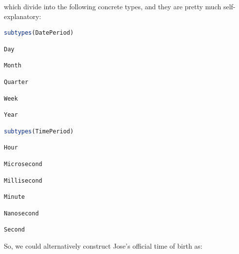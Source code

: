 \documentclass[
  notoc %
]{tufte-book}
\begin{document}
which divide into the following concrete types, and they are pretty much
self-explanatory:

\begin{lstlisting}[language=Julia]
subtypes(DatePeriod)
\end{lstlisting}

\begin{lstlisting}[language=Output]
Day
\end{lstlisting}

\begin{lstlisting}[language=Output]
Month
\end{lstlisting}

\begin{lstlisting}[language=Output]
Quarter
\end{lstlisting}

\begin{lstlisting}[language=Output]
Week
\end{lstlisting}

\begin{lstlisting}[language=Output]
Year
\end{lstlisting}

\begin{lstlisting}[language=Julia]
subtypes(TimePeriod)
\end{lstlisting}

\begin{lstlisting}[language=Output]
Hour
\end{lstlisting}

\begin{lstlisting}[language=Output]
Microsecond
\end{lstlisting}

\begin{lstlisting}[language=Output]
Millisecond
\end{lstlisting}

\begin{lstlisting}[language=Output]
Minute
\end{lstlisting}

\begin{lstlisting}[language=Output]
Nanosecond
\end{lstlisting}

\begin{lstlisting}[language=Output]
Second
\end{lstlisting}

So, we could alternatively construct Jose's official time of birth as:
\end{document}
